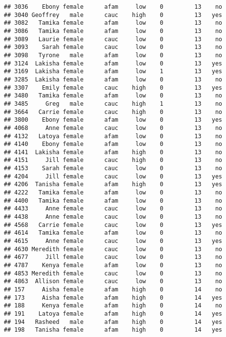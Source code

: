\documentclass[
]{article}
\begin{document}
\begin{verbatim}
## 3036    Ebony female      afam     low    0         13    no
## 3040 Geoffrey   male      cauc    high    0         13   yes
## 3082   Tamika female      afam     low    0         13    no
## 3086   Tamika female      afam     low    0         13    no
## 3089   Laurie female      cauc     low    0         13    no
## 3093    Sarah female      cauc     low    0         13    no
## 3098   Tyrone   male      afam     low    0         13    no
## 3124  Lakisha female      afam     low    0         13   yes
## 3169  Lakisha female      afam     low    1         13   yes
## 3285  Lakisha female      afam     low    0         13    no
## 3307    Emily female      cauc    high    0         13   yes
## 3480   Tamika female      afam     low    0         13    no
## 3485     Greg   male      cauc    high    1         13    no
## 3664   Carrie female      cauc    high    0         13    no
## 3800    Ebony female      afam     low    0         13   yes
## 4068     Anne female      cauc     low    0         13    no
## 4132   Latoya female      afam     low    0         13    no
## 4140    Ebony female      afam     low    0         13    no
## 4141  Lakisha female      afam    high    0         13    no
## 4151     Jill female      cauc    high    0         13    no
## 4153    Sarah female      cauc     low    0         13    no
## 4204     Jill female      cauc     low    0         13   yes
## 4206  Tanisha female      afam    high    0         13   yes
## 4222   Tamika female      afam     low    0         13    no
## 4400   Tamika female      afam     low    0         13    no
## 4433     Anne female      cauc     low    0         13    no
## 4438     Anne female      cauc     low    0         13    no
## 4568   Carrie female      cauc     low    0         13   yes
## 4614   Tamika female      afam     low    0         13    no
## 4615     Anne female      cauc     low    0         13   yes
## 4630 Meredith female      cauc     low    0         13    no
## 4677     Jill female      cauc     low    0         13    no
## 4787    Kenya female      afam     low    0         13    no
## 4853 Meredith female      cauc     low    0         13    no
## 4863  Allison female      cauc     low    0         13    no
## 157     Aisha female      afam    high    0         14    no
## 173     Aisha female      afam    high    0         14   yes
## 188     Kenya female      afam    high    0         14    no
## 191    Latoya female      afam    high    0         14   yes
## 194   Rasheed   male      afam    high    0         14   yes
## 198   Tanisha female      afam    high    0         14   yes

\end{verbatim}
\end{document}
